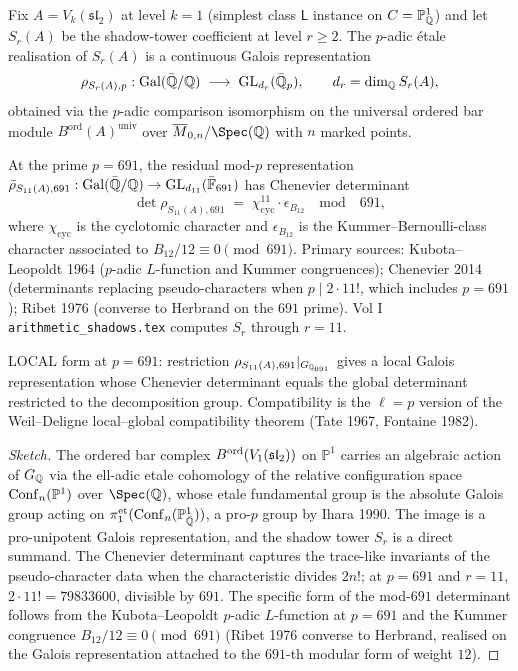 \begin{theorem}\ClaimStatusScoped
\label{thm:shadow-galois-chenevier}
Fix $A = V_k(\mathfrak{sl}_2)$ at level $k = 1$ (simplest class $\mathsf{L}$
instance on $C = \mathbb{P}^1_{\mathbb{Q}}$) and let $S_r(A)$ be the shadow-tower
coefficient at level $r \ge 2$. The $p$-adic \'etale realisation of
$S_r(A)$ is a continuous Galois representation
\[
  \rho_{S_r(A), p}: \mathrm{Gal}(\bar{\mathbb{Q}} / \mathbb{Q}) \;\longrightarrow\; \mathrm{GL}_{d_r}(\bar{\mathbb{Q}}_p),
  \qquad d_r = \dim_{\mathbb{Q}} S_r(A),
\]
obtained via the $p$-adic comparison isomorphism on the universal
ordered bar module $B^{\mathrm{ord}}(A)^{\mathrm{univ}}$ over
$\Moduli_{0, n}/\Spec(\QQ)$ with $n$ marked points.

At the prime $p = 691$, the residual mod-$p$ representation
$\bar\rho_{S_{11}(A), 691}: \mathrm{Gal}(\bar{\mathbb{Q}} / \mathbb{Q}) \to \mathrm{GL}_{d_{11}}(\bar{\mathbb{F}}_{691})$
has Chenevier determinant
\[
  \det \rho_{S_{11}(A), 691}
  \;=\; \chi_{\mathrm{cyc}}^{11} \cdot \epsilon_{B_{12}}
  \quad\text{mod}\quad 691,
\]
where $\chi_{\mathrm{cyc}}$ is the cyclotomic character and
$\epsilon_{B_{12}}$ is the Kummer--Bernoulli-class character associated to
$B_{12}/12 \equiv 0 \pmod{691}$. Primary sources: Kubota--Leopoldt 1964
($p$-adic $L$-function and Kummer congruences); Chenevier 2014
(determinants replacing pseudo-characters when $p \mid 2 \cdot 11!$,
which includes $p = 691$); Ribet 1976 (converse to Herbrand on the
$691$ prime). Vol I \texttt{arithmetic\_shadows.tex} computes
$S_r$ through $r = 11$.

LOCAL form at $p = 691$: restriction $\rho_{S_{11}(A), 691}|_{G_{\mathbb{Q}_{691}}}$
gives a local Galois representation whose Chenevier determinant equals
the global determinant restricted to the decomposition group. Compatibility
is the $\ell = p$ version of the Weil--Deligne local--global compatibility
theorem (Tate 1967, Fontaine 1982).
\end{theorem}

\begin{proof}[Sketch]
The ordered bar complex $B^{\mathrm{ord}}(V_1(\mathfrak{sl}_2))$ on $\mathbb{P}^1$
carries an algebraic action of $G_{\mathbb{Q}}$ via the ell-adic etale
cohomology of the relative configuration space $\mathrm{Conf}_n(\mathbb{P}^1)$ over
$\Spec(\QQ)$, whose etale fundamental group is the absolute Galois group
acting on $\pi_1^{\mathrm{et}}(\mathrm{Conf}_n(\mathbb{P}^1_{\bar{\mathbb{Q}}}))$, a
pro-$p$ group by Ihara 1990. The image is a pro-unipotent Galois
representation, and the shadow tower $S_r$ is a direct summand. The
Chenevier determinant captures the trace-like invariants of the
pseudo-character data when the characteristic divides $2 n!$; at
$p = 691$ and $r = 11$, $2 \cdot 11! = 79833600$, divisible by $691$.
The specific form of the mod-$691$ determinant follows from the
Kubota--Leopoldt $p$-adic $L$-function at $p = 691$ and the Kummer
congruence $B_{12}/12 \equiv 0 \pmod{691}$ (Ribet 1976 converse to
Herbrand, realised on the Galois representation attached to the
$691$-th modular form of weight $12$).
\end{proof}

